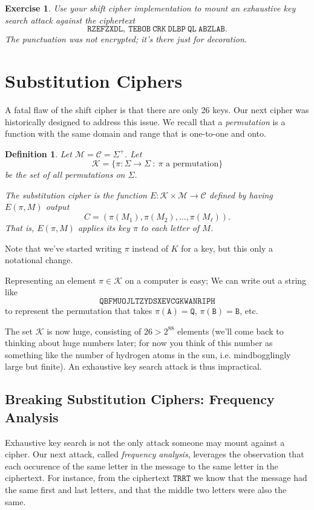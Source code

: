 \documentclass[11pt]{article}
\newtheorem{exercise}{Exercise}
\newtheorem{definition}{Definition}
\newcommand{\msgs}{\mathcal{M}}
\newcommand{\ctxts}{\mathcal{C}}
\newcommand{\keys}{\mathcal{K}}
\newcommand{\enc}{E}
\begin{document}
\begin{exercise}
    Use your shift cipher implementation to mount an exhaustive key search
    attack against the ciphertext
    \[
        \mathtt{RZEFZXDL,\ TEBOB\ CRK\ DLBP\ QL\ ABZLAB.}
    \]
    The punctuation was not encrypted; it's there just for decoration.
\end{exercise}

\section{Substitution Ciphers}

A fatal flaw of the shift cipher is that there are only 26 keys.  Our next
cipher was historically designed to address this issue.  We recall that a
\emph{permutation} is a function with the same domain and range that is
one-to-one and onto.

\begin{definition}
    Let $\msgs=\ctxts=\Sigma^+$. 
    Let
    \[
        \keys = \{ \pi:\Sigma\to\Sigma \ :\  \pi\text{ a permutation}\}
    \]
    be the set of all permutations on $\Sigma$.

    The \emph{substitution cipher} is the function
    $\enc:\keys\times\msgs\to\ctxts$ defined by having $\enc(\pi,M)$ output 
    \[
        C = (\pi(M_1),\pi(M_2),\ldots,\pi(M_\ell)).
    \]
    That is, $\enc(\pi,M)$ applies its key $\pi$ to each letter of $M$.
\end{definition}
Note that we've started writing $\pi$ instead of $K$ for a key, but this
only a notational change.

Representing an element $\pi\in\keys$ on a computer is easy; We can write out
a string like
\[
    \mathtt{QBFMUOJLTZYDSXEVCGKWANRIPH}
\]
to represent the permutation that takes $\pi(\mathtt{A})=\mathtt{Q}$,
$\pi(\mathtt{B})=\mathtt{B}$, etc.

The set $\keys$ is now huge, consisting of $26\! > 2^{88}$ elements (we'll come
back to thinking about huge numbers later; for now you think of this number as
something like the number of hydrogen atoms in the sun, i.e. mindbogglingly
large but finite). An exhaustive key search attack is thus impractical.

\subsection{Breaking Substitution Ciphers: Frequency Analysis}

Exhaustive key search is not the only attack someone may mount against a
cipher. Our next attack, called \emph{frequency analysis}, leverages the
observation that each occurence of the same letter in the message  to the
same letter in the ciphertext. For instance, from the ciphertext
$\mathtt{TRRT}$ we know that the message had the same first and last
letters, and that the middle two letters were also the same.
\end{document}
